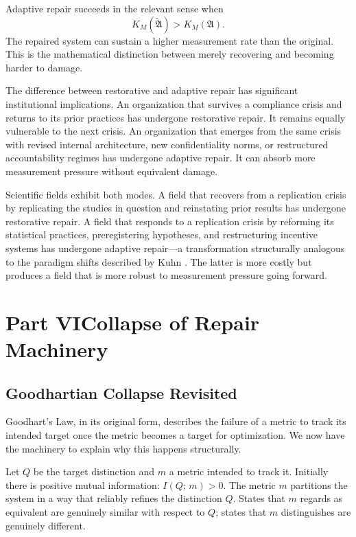 \documentclass[12pt, a4paper]{article}
\theoremstyle{flyxion}
\newcommand{\fA}{\mathfrak{A}}
\newcommand{\KM}{K_{M}}
\newcommand{\tA}{\widetilde{\fA}}
\begin{document}
Adaptive repair succeeds in the relevant sense when
\[
  \KM(\tA) > \KM(\fA).
\]
The repaired system can sustain a higher measurement rate than the original. This is the mathematical distinction between merely recovering and becoming harder to damage.

The difference between restorative and adaptive repair has significant institutional implications. An organization that survives a compliance crisis and returns to its prior practices has undergone restorative repair. It remains equally vulnerable to the next crisis. An organization that emerges from the same crisis with revised internal architecture, new confidentiality norms, or restructured accountability regimes has undergone adaptive repair. It can absorb more measurement pressure without equivalent damage.

Scientific fields exhibit both modes. A field that recovers from a replication crisis by replicating the studies in question and reinstating prior results has undergone restorative repair. A field that responds to a replication crisis by reforming its statistical practices, preregistering hypotheses, and restructuring incentive systems has undergone adaptive repair---a transformation structurally analogous to the paradigm shifts described by Kuhn \cite{kuhn1962}. The latter is more costly but produces a field that is more robust to measurement pressure going forward.


\section*{Part VI\quad Collapse of Repair Machinery}

\subsection*{Goodhartian Collapse Revisited}

Goodhart's Law, in its original form, describes the failure of a metric to track its intended target once the metric becomes a target for optimization. We now have the machinery to explain why this happens structurally.

Let $Q$ be the target distinction and $m$ a metric intended to track it. Initially there is positive mutual information: $I(Q;\, m) > 0$. The metric $m$ partitions the system in a way that reliably refines the distinction $Q$. States that $m$ regards as equivalent are genuinely similar with respect to $Q$; states that $m$ distinguishes are genuinely different.
\end{document}

